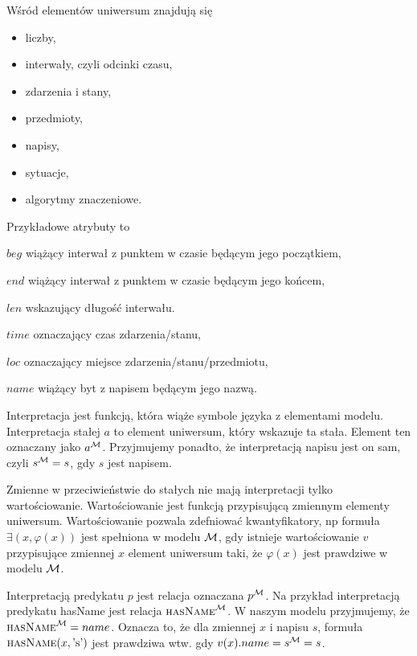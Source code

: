 \documentclass[a4paper,12pt]{article}
\newcommand{\hasName}[2]{\text{{\sc hasName}}(#1,\text{'#2'})}
\begin{document}
Wśród elementów uniwersum znajdują się 
\begin{itemize}
\item liczby,
\item interwały, czyli odcinki czasu,
\item zdarzenia i stany,
\item przedmioty,
\item napisy,%
\item sytuacje,
\item algorytmy znaczeniowe.
\end{itemize}

Przykładowe atrybuty to 
\begin{description}
\item $beg$ wiążący interwał z punktem w czasie będącym jego początkiem, 
\item $end$ wiążący interwał z punktem w czasie będącym jego końcem, 
\item $len$ wskazujący długość interwału.
\item $time$ oznaczający czas zdarzenia/stanu, 
\item $loc$ oznaczający miejsce zdarzenia/stanu/przedmiotu, %
\item $name$ wiążący byt z napisem będącym jego nazwą.
\end{description}

Interpretacja jest funkcją, która wiąże symbole języka z elementami modelu.
Interpretacja stałej $a$ to element uniwersum, który wskazuje ta stała.
Element ten oznaczany jako $a^{\cal M}$.
Przyjmujemy ponadto, że interpretacją napisu jest on sam,
czyli $s^{\cal M}=s$, gdy $s$ jest napisem.

Zmienne w przeciwieństwie do stałych nie mają interpretacji tylko wartościowanie.
Wartościowanie jest funkcją przypisującą zmiennym elementy uniwersum.
Wartościowanie pozwala zdefniować kwantyfikatory, np formuła $\exists(x,\varphi(x))$ jest
spełniona w modelu ${\cal M}$, gdy istnieje wartościowanie $v$ przypisujące zmiennej $x$
element uniwersum taki, że $\varphi(x)$ jest prawdziwe w modelu ${\cal M}$.

Interpretacją predykatu $p$ jest relacja oznaczana $p^{\cal M}$.
Na przykład interpretacją predykatu {\sc hasName} jest relacja $\text{\sc hasName}^{\cal M}$. 
W naszym modelu przyjmujemy, że $\text{\sc hasName}^{\cal M}=name$. Oznacza to, że 
dla zmiennej $x$ i napisu $s$, formuła $\hasName{x}{s}$ jest prawdziwa wtw.
gdy $v(x).name=s^{\cal M}=s$. 
\end{document}
